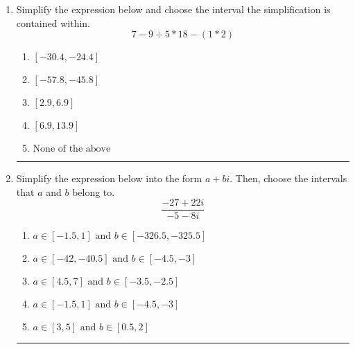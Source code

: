 \documentclass[14pt]{extbook}
\newcommand{\litem}[1]{\item#1\hspace*{-1cm}\rule{\textwidth}{0.4pt}}
\begin{document}
\begin{enumerate}
{\begin{enumerate}[label=\Alph*.]
\end{enumerate} }
\litem{
Simplify the expression below and choose the interval the simplification is contained within.\[ 7 - 9 \div 5 * 18 - (1 * 2) \]\begin{enumerate}[label=\Alph*.]
\item \( [-30.4, -24.4] \)
\item \( [-57.8, -45.8] \)
\item \( [2.9, 6.9] \)
\item \( [6.9, 13.9] \)
\item \( \text{None of the above} \)

\end{enumerate} }
\litem{
Simplify the expression below into the form $a+bi$. Then, choose the intervals that $a$ and $b$ belong to.\[ \frac{-27 + 22 i}{-5 - 8 i} \]\begin{enumerate}[label=\Alph*.]
\item \( a \in [-1.5, 1] \text{ and } b \in [-326.5, -325.5] \)
\item \( a \in [-42, -40.5] \text{ and } b \in [-4.5, -3] \)
\item \( a \in [4.5, 7] \text{ and } b \in [-3.5, -2.5] \)
\item \( a \in [-1.5, 1] \text{ and } b \in [-4.5, -3] \)
\item \( a \in [3, 5] \text{ and } b \in [0.5, 2] \)

\end{enumerate} }
\end{enumerate}
\end{document}
